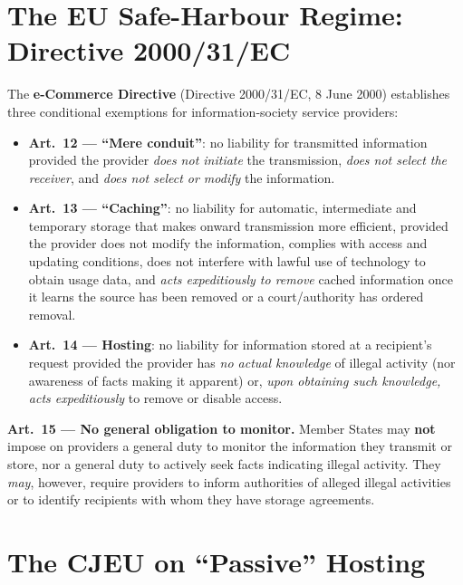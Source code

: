 \documentclass[11pt,a4paper,openany]{report}
\theoremstyle{definition}
\theoremstyle{plain}
\theoremstyle{remark}
\begin{document}
\section{The EU Safe-Harbour Regime: Directive 2000/31/EC}

The \textbf{e-Commerce Directive} (Directive 2000/31/EC, 8 June 2000) establishes three conditional exemptions for information-society service providers:
\begin{itemize}
    \item \textbf{Art.\ 12 --- ``Mere conduit''}: no liability for transmitted information provided the provider \emph{does not initiate} the transmission, \emph{does not select the receiver}, and \emph{does not select or modify} the information.
    \item \textbf{Art.\ 13 --- ``Caching''}: no liability for automatic, intermediate and temporary storage that makes onward transmission more efficient, provided the provider does not modify the information, complies with access and updating conditions, does not interfere with lawful use of technology to obtain usage data, and \emph{acts expeditiously to remove} cached information once it learns the source has been removed or a court/authority has ordered removal.
    \item \textbf{Art.\ 14 --- Hosting}: no liability for information stored at a recipient's request provided the provider has \emph{no actual knowledge} of illegal activity (nor awareness of facts making it apparent) or, \emph{upon obtaining such knowledge, acts expeditiously} to remove or disable access.
\end{itemize}

\begin{keypoint}
\textbf{Art.\ 15 --- No general obligation to monitor.} Member States may \textbf{not} impose on providers a general duty to monitor the information they transmit or store, nor a general duty to actively seek facts indicating illegal activity. They \emph{may}, however, require providers to inform authorities of alleged illegal activities or to identify recipients with whom they have storage agreements.
\end{keypoint}

\section{The CJEU on ``Passive'' Hosting}
\end{document}
